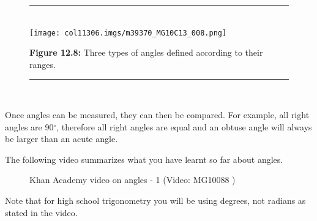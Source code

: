 	\begin{figure}[H] %
    \begin{center}
    \rule[.1in]{\figurerulewidth}{.005in} \\
        \label{m39370*uid25!!!underscore!!!media}\label{m39370*uid25!!!underscore!!!printimage}\texttt{[image: col11306.imgs/m39370\_MG10C13\_008.png]} %
      \vspace{2pt}
    \vspace{\rubberspace}\par \begin{cnxcaption}
	  \small \textbf{Figure 12.8: }Three types of angles defined according to their ranges.
	\end{cnxcaption}
    \vspace{.1in}
    \rule[.1in]{\figurerulewidth}{.005in} \\
    \end{center}
 \end{figure}       
        \label{m39370*id315245}Once angles can be measured, they can then be compared. For example, all right angles are 90${}^{\circ }$, therefore all right angles are equal and an obtuse angle will always be larger than an acute angle.\par \label{m39370*eip-752}The following video summarizes what you have learnt so far about angles.
    \setcounter{subfigure}{0}
	\begin{figure}[H] %
    \textnormal{Khan Academy video on angles - 1}\vspace{.1in} \nopagebreak
  \label{m39370*yt-media1}\label{m39370*yt-video1}
             { (Video:  MG10088 )}
      \vspace{2pt}
    \vspace{.1in}
 \end{figure}       
Note that for high school trigonometry you will be using degrees, not radians as stated in the video. \par 
      \label{m39370*uid26}

